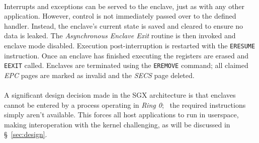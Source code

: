 \paragraph{} Interrupts and exceptions can be served to the enclave, just as with any other application. However, control is not immediately passed over to the defined handler. Instead, the enclave's current state is saved and cleared to ensure no data is leaked. The \textit{Asynchronous Enclave Exit} routine is then invoked and enclave mode disabled. Execution post-interruption is restarted with the \texttt{ERESUME} instruction. Once an enclave has finished executing the registers are erased and \texttt{EEXIT} called. Enclaves are terminated using the \texttt{EREMOVE} command; all claimed \textit{EPC} pages are marked as invalid and the \textit{SECS} page deleted.

\paragraph{} \label{sec:sgx-no-kernel-mode} A significant design decision made in the SGX architecture is that enclaves cannot be entered by a process operating in \textit{Ring 0};~\cite{sgx-prog-reference} the required instructions simply aren't available. This forces all host applications to run in userspace, making interoperation with the kernel challenging, as will be discussed in §~\ref{sec:design}.

